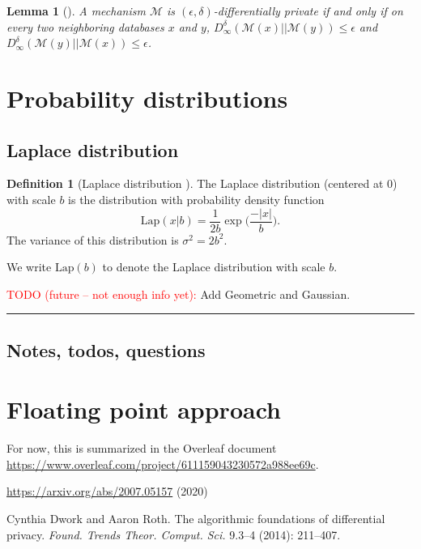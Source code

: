\documentclass[11pt,a4paper]{article}
\newtheorem{lemma}[theorem]{Lemma}
\theoremstyle{definition}
\newtheorem{definition}[theorem]{Definition}
\newcommand{\horizline}{\noindent\rule{\textwidth}{1pt}}
\newcommand{\Lap}{\mathrm{Lap}}
\newcommand{\M}{\mathcal{M}}
\newcommand{\todonei}{{\textcolor{red}{TODO (future -- not enough info yet): }}}
\newcommand{\silvia}[1]{{ {\color{blue}{(silvia)~#1}}}}
\begin{document}
\begin{lemma}[\cite{dr14}]
    A mechanism $\M$ is $(\epsilon, \delta)$-differentially private if and only if on every two neighboring databases $x$ and $y$, $D_{\infty}^{\delta}(\M(x)||\M(y)) \leq \epsilon$ and $D_{\infty}^{\delta}(\M(y)||\M(x)) \leq \epsilon$.
\end{lemma}


\section{Probability distributions}
\subsection{Laplace distribution}
\begin{definition}[Laplace distribution \cite{dr14}]
    The Laplace distribution (centered at 0) with scale $b$ is the distribution with probability density function
    \[
        \Lap(x|b) = \dfrac{1}{2b} \exp \Big(\dfrac{-|x|}{b}\Big).
    \]
    The variance of this distribution is $\sigma^2 = 2b^2$. \silvia{Add cumulative def.? Probably not necessary. Discuss anything else we would like to add.}
\end{definition}
We write $\Lap(b)$ to denote the Laplace distribution with scale $b$.

\todonei{Add Geometric and Gaussian.}

\horizline

\subsection{Notes, todos, questions}

\section{Floating point approach}
For now, this is summarized in the Overleaf document \url{https://www.overleaf.com/project/611159043230572a988ee69c}.

\begin{thebibliography}{99}

\url{https://arxiv.org/abs/2007.05157} (2020)

Cynthia Dwork and Aaron Roth. The algorithmic foundations of differential privacy. \textit{Found. Trends Theor. Comput. Sci.} 9.3--4 (2014): 211--407.


\end{thebibliography}
\end{document}
